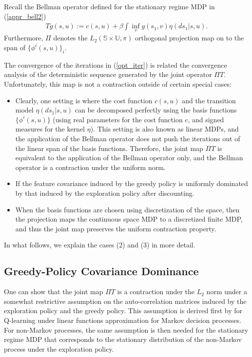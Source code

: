 \documentclass[11pt]{article}
\begin{document}
Recall the Bellman operator defined for the stationary regime MDP in (\ref{appr_bell2})
\begin{align*}
T g(s,u) := c(s,u) + \beta \int \inf_v{g}(s_1,v)\eta(ds_1|s,u).
\end{align*}
Furthermore, $\Pi$ denotes the $L_2(\mathds{S}\times\mathds{U},\pi)$ orthogonal projection map on to the span of $\{\phi^i(s,u)\}_i$.  

The convergence of the iterations in (\ref{opt_iter}) is  related the convergence analysis of the deterministic sequence generated by the joint operator $\Pi T$. Unfortunately, this map is not a contraction outside of certain special cases:
\begin{itemize}
\item[1)] Clearly, one setting is where the cost function $c(s,u)$ and the transition model $\eta(ds_1|s,u)$ can be decomposed perfectly using the basis functions $\{\phi^i(s,u)\}$ (using real parameters for the cost function $c$, and signed measures for the kernel $\eta$). This setting is also known as linear MDPs, and the application of the Bellman operator does not push the iterations out of the linear span of the basis functions. Therefore, the joint map $\Pi T$ is equivalent to the application of the Bellman operator only, and the Bellman operator is a contraction under the uniform norm.
\item[2)] If the feature covariance induced by the greedy policy
is uniformly dominated by that induced by the exploration policy after discounting. 
\item[3)] When the basis functions are chosen using discretization of the space, then the projection maps the continuous space MDP to a discretized finite MDP, and thus the joint map preserves the uniform contraction property. 
\end{itemize}
In what follows, we explain the cases (2) and (3) in more detail.

\subsection{Greedy-Policy Covariance Dominance}\label{near_opt_exp}
One can show that the joint map $\Pi T$ is a contraction under the $L_2$ norm under a somewhat restrictive assumption on the auto-correlation matrices induced by the exploration policy and the greedy policy. This assumption is derived first by \cite{melo2008analysis} for Q-learning under linear functions approximation for Markov decision processes. For non-Markov processes, the same assumption is then needed for the stationary regime MDP that corresponds to the stationary distribution of the non-Markov process under the exploration policy.
\end{document}
